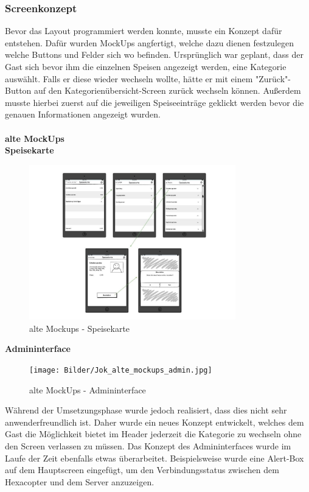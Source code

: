     \subsubsection{Screenkonzept}
Bevor das Layout programmiert werden konnte, musste ein Konzept dafür entstehen. Dafür wurden MockUps angfertigt, welche dazu dienen festzulegen welche Buttons und Felder sich wo befinden.
Ursprünglich war geplant, dass der Gast sich bevor ihm die einzelnen Speisen angezeigt werden, eine Kategorie auswählt. Falls er diese wieder wechseln wollte, hätte er mit einem "Zurück"-Button auf den Kategorienübersicht-Screen zurück wechseln können. Außerdem musste hierbei zuerst auf die jeweiligen Speiseeinträge geklickt werden bevor die genauen Informationen angezeigt wurden.
\\ \\
\textbf{alte MockUps}\\
\textbf{Speisekarte}\\
			\begin{figure}[H]
			\begin{centering}
			\includegraphics[width = 0.8\textwidth]{Bilder/Jok_alte_mockups.jpg}
			\par\end{centering}
			\caption{alte Mockups - Speisekarte}
			\label{alte Mockups - Speisekarte}
			\end{figure}\textbf{Admininterface}\\
			\begin{figure}[H]
			\begin{centering}
			\texttt{[image: Bilder/Jok\_alte\_mockups\_admin.jpg]}
			\par\end{centering}
			\caption{alte MockUps - Admininterface}
			\label{alte MockUps}
			\end{figure}Während der Umsetzungsphase wurde jedoch realisiert, dass dies nicht sehr anwenderfreundlich ist. Daher wurde ein neues Konzept entwickelt, welches dem Gast die Möglichkeit bietet im Header jederzeit die Kategorie zu wechseln ohne den Screen verlassen zu müssen. Das Konzept des Admininterfaces wurde im Laufe der Zeit ebenfalls etwas überarbeitet. Beispielsweise wurde eine Alert-Box auf dem Hauptscreen eingefügt, um den Verbindungsstatus zwischen dem Hexacopter und dem Server anzuzeigen.
